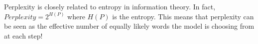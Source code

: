 \clearpage

\thispagestyle{customstyle}

{Perplexity is closely related to entropy in information theory. In fact, $Perplexity = 2^{H(P)}$
where \(H(P)\) is the entropy. This means that perplexity can be seen as the effective 
number of equally likely words the model is choosing from at each step!}